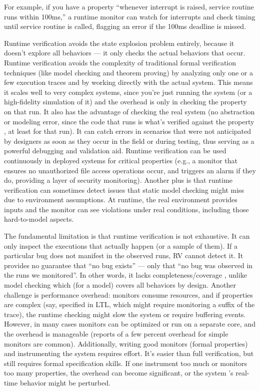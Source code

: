 For example, if you have a property “whenever interrupt is raised, service routine runs within 100ms,” a
runtime monitor can watch for interrupts and check timing until service routine is called, flagging an error if
the 100ms deadline is missed.

Runtime verification avoids the state explosion problem entirely, because it doesn’t explore all
behaviors — it only checks the actual behaviors that occur. Runtime verification 
avoids the complexity of traditional formal verification techniques (like model 
checking and theorem proving) by analyzing only one or a few execution traces 
and by working directly with the actual system. This means it scales well to 
very complex systems, since you’re just running the system (or a
high-fidelity simulation of it) and the overhead is only in checking the property 
on that run. It also has the advantage of checking the real system (no abstraction 
or modeling error, since the code that runs is what’s verified against the property
, at least for that run). It can catch errors in scenarios that were not anticipated
by designers as soon as they occur in the field or during testing, thus serving 
as a powerful debugging and validation aid. Runtime verification can be used 
continuously in deployed systems for critical properties
(e.g., a monitor that ensures no unauthorized file access operations occur, 
and triggers an alarm if they do, providing a layer of security monitoring).
Another plus is that runtime verification can sometimes detect issues that static model checking might miss
due to environment assumptions. At runtime, the real environment provides inputs and the monitor can
see violations under real conditions, including those hard-to-model aspects.


The fundamental limitation is that runtime verification is not exhaustive. It 
can only inspect the executions that actually happen (or a sample of them). 
If a particular bug does not manifest in the observed runs, RV cannot detect 
it. It provides no guarantee that “no bug exists” — only that “no bug was
observed in the runs we monitored”. In other words, it lacks completeness/coverage
, unlike model checking which (for a model) covers all behaviors by design. 
Another challenge is performance overhead:
monitors consume resources, and if properties are complex (say, specified in 
LTL, which might require monitoring a suffix of the trace), the runtime checking 
might slow the system or require buffering events.
However, in many cases monitors can be optimized or run on a separate core, 
and the overhead is manageable (reports of a few percent overhead for simple 
monitors are common).
Additionally, writing good monitors (formal properties) and instrumenting the 
system requires effort. It’s easier than full verification, but still requires 
formal specification skills. If one instrument too much or
monitors too many properties, the overhead can become significant, or the system
’s real-time behavior might be perturbed.


